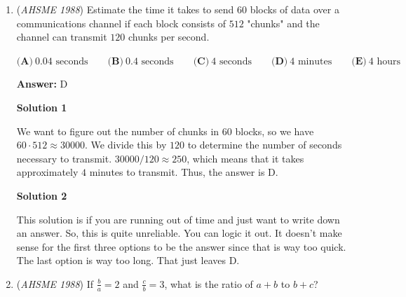 \begin{enumerate}
 \textbf{Answer: }A



\textbf{Solution}

The definition of an equiangular parallelogram is that all the angles are equal, and that pairs of sides are parallel. It may be a rectangle, because all the angles are equal and it is a parallelogram. It is not necessarily a regular polygon, because if the polygon is a pentagon, it is not a parallelogram. It is not necessarily a rhombus, because all the angles are not necessarily equal.  It may be a square, since it is a parallelogram and all the angles are equal. It is not necessarily a trapezoid, because the angles are not necessarily equal. We have that it could be a square or a rectangle. A square is a rectangle, but a rectangle is not necessarily a square. We want the all-encompassing answer so the answer is a rectange $\implies \boxed{\text{A}}$.

 


	\item (\textit{AHSME 1988}) Estimate the time it takes to send $60$ blocks of data over a communications channel if each block consists of $512$
"chunks" and the channel can transmit $120$ chunks per second.


 $\textbf{(A)}\ 0.04 \text{ seconds}\qquad \textbf{(B)}\ 0.4 \text{ seconds}\qquad \textbf{(C)}\ 4 \text{ seconds}\qquad \textbf{(D)}\ 4\text{ minutes}\qquad \textbf{(E)}\ 4\text{ hours}$

 \textbf{Answer: }D



\textbf{Solution 1}

We want to figure out the number of chunks in $60$ blocks, so we have $60\cdot 512 \approx 30000$. We divide this by $120$ to determine the number of seconds necessary to transmit. $30000/120 \approx 250$, which means that it takes approximately $4$ minutes to transmit. Thus, the answer is $\boxed{\text{D}}$.

 



\textbf{Solution 2}

This solution is if you are running out of time and just want to write down an answer. So, this is quite unreliable. You can logic it out. It doesn't make sense for the first three options to be the answer since that is way too quick. The last option is way too long. That just leaves $\boxed{\text{D}}$.

 


	\item (\textit{AHSME 1988}) If $\frac{b}{a} = 2$ and $\frac{c}{b} = 3$, what is the ratio of $a + b$ to $b + c$?



\end{enumerate}
